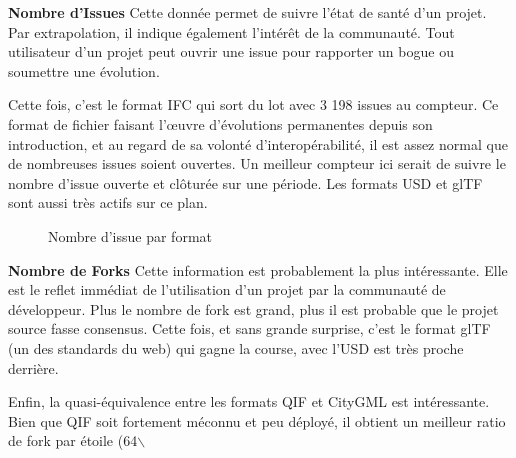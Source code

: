 \documentclass[a4paper,12pt]{article}
\begin{document}
\textbf{Nombre d'Issues}
Cette donnée permet de suivre l'état de santé d'un projet. Par extrapolation, il indique également l'intérêt de la communauté. Tout utilisateur d'un projet peut ouvrir une issue pour rapporter un bogue ou soumettre une évolution.

Cette fois, c'est le format IFC qui sort du lot avec 3 198 issues au compteur. Ce format de fichier faisant l'œuvre d'évolutions permanentes depuis son introduction, et au regard de sa volonté d'interopérabilité, il est assez normal que de nombreuses issues soient ouvertes. Un meilleur compteur ici serait de suivre le nombre d'issue ouverte et clôturée sur une période.
Les formats USD et glTF sont aussi très actifs sur ce plan.

\begin{latex}
\begin{figure}[!h]
    \centering
    \caption{Nombre d'issue par format}
    \label{fig:mon_graphique}
\end{figure}
\end{latex}

\textbf{Nombre de Forks}
Cette information est probablement la plus intéressante. Elle est le reflet immédiat de l'utilisation d'un projet par la communauté de développeur. Plus le nombre de fork est grand, plus il est probable que le projet source fasse consensus. 
Cette fois, et sans grande surprise, c'est le format glTF (un des standards du web) qui gagne la course, avec l'USD est très proche derrière.

Enfin, la quasi-équivalence entre les formats QIF et CityGML est intéressante. Bien que QIF soit fortement méconnu et peu déployé, il obtient un meilleur ratio de fork par étoile (64$\backslash$%
\end{document}
